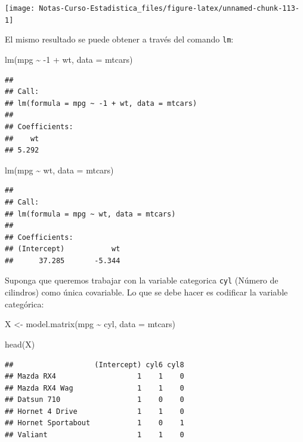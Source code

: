 \documentclass[
  12pt,
]{book}
\newenvironment{Shaded}{\begin{snugshade}}{\end{snugshade}}
\newcommand{\AttributeTok}[1]{\textcolor[rgb]{0.77,0.63,0.00}{#1}}
\newcommand{\DecValTok}[1]{\textcolor[rgb]{0.00,0.00,0.81}{#1}}
\newcommand{\FunctionTok}[1]{\textcolor[rgb]{0.00,0.00,0.00}{#1}}
\newcommand{\NormalTok}[1]{#1}
\newcommand{\OtherTok}[1]{\textcolor[rgb]{0.56,0.35,0.01}{#1}}
\newcommand{\SpecialCharTok}[1]{\textcolor[rgb]{0.00,0.00,0.00}{#1}}
\begin{document}
\begin{center}\texttt{[image: Notas-Curso-Estadistica\_files/figure-latex/unnamed-chunk-113-1]} \end{center}

El mismo resultado se puede obtener a través del comando \verb|lm|:

\begin{Shaded}
\begin{Highlighting}[]
\FunctionTok{lm}\NormalTok{(mpg }\SpecialCharTok{\textasciitilde{}} \SpecialCharTok{{-}}\DecValTok{1} \SpecialCharTok{+}\NormalTok{ wt, }\AttributeTok{data =}\NormalTok{ mtcars)}
\end{Highlighting}
\end{Shaded}

\begin{verbatim}
## 
## Call:
## lm(formula = mpg ~ -1 + wt, data = mtcars)
## 
## Coefficients:
##    wt  
## 5.292
\end{verbatim}

\begin{Shaded}
\begin{Highlighting}[]
\FunctionTok{lm}\NormalTok{(mpg }\SpecialCharTok{\textasciitilde{}}\NormalTok{ wt, }\AttributeTok{data =}\NormalTok{ mtcars)}
\end{Highlighting}
\end{Shaded}

\begin{verbatim}
## 
## Call:
## lm(formula = mpg ~ wt, data = mtcars)
## 
## Coefficients:
## (Intercept)           wt  
##      37.285       -5.344
\end{verbatim}

Suponga que queremos trabajar con la variable categorica \texttt{cyl}
(Número de cilindros) como única covariable. Lo que se debe hacer es
codificar la variable categórica:

\begin{Shaded}
\begin{Highlighting}[]
\NormalTok{X }\OtherTok{\textless{}{-}} \FunctionTok{model.matrix}\NormalTok{(mpg }\SpecialCharTok{\textasciitilde{}}\NormalTok{ cyl, }\AttributeTok{data =}\NormalTok{ mtcars)}

\FunctionTok{head}\NormalTok{(X)}
\end{Highlighting}
\end{Shaded}

\begin{verbatim}
##                   (Intercept) cyl6 cyl8
## Mazda RX4                   1    1    0
## Mazda RX4 Wag               1    1    0
## Datsun 710                  1    0    0
## Hornet 4 Drive              1    1    0
## Hornet Sportabout           1    0    1
## Valiant                     1    1    0
\end{verbatim}
\end{document}
